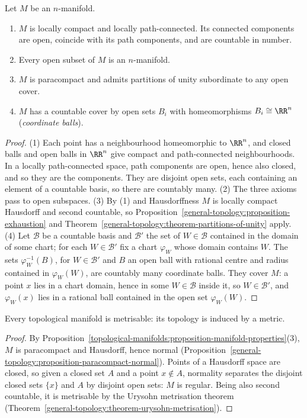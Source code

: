 \begin{proposition}\label{topological-manifolds:proposition-manifold-properties}
Let $M$ be an $n$-manifold.
\begin{enumerate}
\item $M$ is locally compact and locally path-connected. Its connected components are open, coincide with its path components, and are countable in number.
\item Every open subset of $M$ is an $n$-manifold.
\item $M$ is paracompact and admits partitions of unity subordinate to any open cover.
\item $M$ has a countable cover by open sets $B_i$ with homeomorphisms $B_i \cong \RR^n$ (\emph{coordinate balls}).
\end{enumerate}
\end{proposition}

\begin{proof}
(1) Each point has a neighbourhood homeomorphic to $\RR^n$, and closed balls and open balls in $\RR^n$ give compact and path-connected neighbourhoods. In a locally path-connected space, path components are open, hence
also closed, and so they are the components. They are disjoint open sets, each containing an element of a countable basis, so there are countably many. (2) The three axioms pass to open subspaces. (3) By (1) and
Hausdorffness $M$ is locally compact Hausdorff and second countable, so Proposition~\ref{general-topology:proposition-exhaustion} and Theorem~\ref{general-topology:theorem-partitions-of-unity} apply. (4) Let
$\mathcal{B}$ be a countable basis and $\mathcal{B}'$ the set of $W \in \mathcal{B}$ contained in the domain of some chart; for each $W \in \mathcal{B}'$ fix a chart $\varphi_W$ whose domain contains $W$. The sets $\varphi_W^{-1}(B)$, for
$W \in \mathcal{B}'$ and $B$ an open ball with rational centre and radius contained in $\varphi_W(W)$, are countably many coordinate balls. They cover $M$: a point $x$ lies in a chart domain, hence in some $W \in \mathcal{B}$ inside it,
so $W \in \mathcal{B}'$, and $\varphi_W(x)$ lies in a rational ball contained in the open set $\varphi_W(W)$.
\end{proof}

\begin{corollary}\label{topological-manifolds:corollary-metrisable}
Every topological manifold is metrisable: its topology is induced by a metric.
\end{corollary}

\begin{proof}
By Proposition~\ref{topological-manifolds:proposition-manifold-properties}(3), $M$ is paracompact and Hausdorff, hence normal (Proposition~\ref{general-topology:proposition-paracompact-normal}). Points of a Hausdorff
space are closed, so given a closed set $A$ and a point $x \notin A$, normality separates the disjoint closed sets $\{x\}$ and $A$ by disjoint open sets: $M$ is regular. Being also second countable, it is metrisable
by the Urysohn metrisation theorem (Theorem~\ref{general-topology:theorem-urysohn-metrisation}).
\end{proof}

